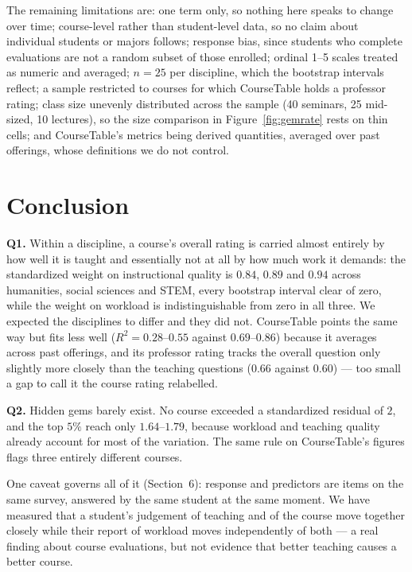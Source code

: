 \documentclass[11pt]{article}
\begin{document}
The remaining limitations are: one term only, so nothing here speaks to change
over time; course-level rather than student-level data, so no claim about
individual students or majors follows; response bias, since students who
complete evaluations are not a random subset of those enrolled; ordinal 1--5
scales treated as numeric and averaged; $n = 25$ per discipline, which the
bootstrap intervals reflect; a sample restricted to courses for which
CourseTable holds a professor rating; class size unevenly distributed across the
sample (40 seminars, 25 mid-sized, 10 lectures), so the size comparison in
Figure~\ref{fig:gemrate} rests on thin cells; and CourseTable's metrics being
derived quantities, averaged over past offerings, whose definitions we do not
control.

\section{Conclusion}

\textbf{Q1.} Within a discipline, a course's overall rating is carried almost
entirely by how well it is taught and essentially not at all by how much work it
demands: the standardized weight on instructional quality is $0.84$, $0.89$ and
$0.94$ across humanities, social sciences and STEM, every bootstrap interval
clear of zero, while the weight on workload is indistinguishable from zero in
all three. We expected the disciplines to differ and they did not. CourseTable
points the same way but fits less well ($R^2 = 0.28$--$0.55$ against
$0.69$--$0.86$) because it averages across past offerings, and its professor
rating tracks the overall question only slightly more closely than the teaching
questions ($0.66$ against $0.60$) --- too small a gap to call it the course
rating relabelled.

\textbf{Q2.} Hidden gems barely exist. No course exceeded a standardized
residual of $2$, and the top $5\%$ reach only $1.64$--$1.79$, because workload
and teaching quality already account for most of the variation. The same rule on
CourseTable's figures flags three entirely different courses.

One caveat governs all of it (Section~6): response and predictors are items on
the same survey, answered by the same student at the same moment. We have
measured that a student's judgement of teaching and of the course move together
closely while their report of workload moves independently of both --- a real
finding about course evaluations, but not evidence that better teaching causes a
better course.
\end{document}
